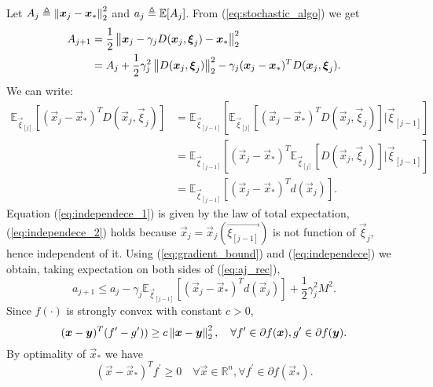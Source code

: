 Let $A_j\triangleq \left\Vert \boldsymbol{x}_j-\boldsymbol{x}_* \right\Vert^2_2$ and $a_j\triangleq\mathbb{E}[A_j]$.
From (\ref*{eq:stochastic_algo}) we get
\begin{equation}
\begin{aligned}
A_{j+1} &= \frac{1}{2}\left\Vert \boldsymbol{x}_j - \gamma_jD(\boldsymbol{x}_j,\boldsymbol{\xi}_j) -\boldsymbol{x}_* \right\Vert^2_2\\ 
&= A_j +\frac{1}{2}\gamma_j^2\left\Vert D(\boldsymbol{x}_j,\boldsymbol{\xi}_j) \right\Vert^2_2 - \gamma_j(\boldsymbol{x}_j-\boldsymbol{x}_*)^TD(\boldsymbol{x}_j,\boldsymbol{\xi}_j).
\end{aligned}
\label{eq:aj_rec}
\end{equation}
We can write:
\begin{align}
\mathbb{E}_{\vec{\xi}_{[j]}}[(\vec{x}_j-\vec{x}_*)^TD(\vec{x}_j,\vec{\xi}_j)] &= \mathbb{E}_{\vec{\xi}_{[j-1]}}[\mathbb{E}_{\vec{\xi}_{[j]}}[(\vec{x}_j-\vec{x}_*)^TD(\vec{x}_j,\vec{\xi}_j)]|\vec{\xi}_{[j-1]}] \label{eq:independece_1}\\ 
&= \mathbb{E}_{\vec{\xi}_{[j-1]}}[(\vec{x}_j-\vec{x}_*)^T\mathbb{E}_{\vec{\xi}_{[j]}}[D(\vec{x}_j,\vec{\xi}_j)]|\vec{\xi}_{[j-1]}]\label{eq:independece_2} \\ 	
&=\mathbb{E}_{\vec{\xi}_{[j-1]}}[(\vec{x}_j-\vec{x}_*)^Td(\vec{x}_j)].	\label{eq:independece}
\end{align}
Equation (\ref{eq:independece_1}) is given by the law of total expectation, (\ref{eq:independece_2}) holds because $\vec{x}_j = \vec{x}_j(\vec{\xi_{[j-1]}})$ is not function of $\vec{\xi}_j$, hence independent of it.
Using (\ref{eq:gradient_bound}) and (\ref{eq:independece}) we obtain, taking expectation on both sides of (\ref{eq:aj_rec}),
\begin{equation}
a_{j+1} \leq a_j - \gamma_j\mathbb{E}_{\vec{\xi}_{[j-1]}}[(\vec{x}_j-\vec{x}_*)^Td(\vec{x}_j)] + \frac{1}{2}\gamma_j^2M^2.
\label{eq:aj_rec_2}
\end{equation}
Since $f(\cdot)$ is strongly convex with constant $c>0$,
\begin{equation}
(\boldsymbol{x}-\boldsymbol{y})^T(f^\prime- g^\prime))\geq c \left\Vert \boldsymbol{x}-\boldsymbol{y} \right\Vert^2_2, \quad \forall f^\prime\in\partial f(\boldsymbol{x}), g^\prime\in\partial f(\boldsymbol{y}).
\label{eq:strong_convexity}
\end{equation}
By optimality of $\vec{x}_*$ we have
\begin{equation}
(\vec{x}-\vec{x}_*)^T f^\prime \geq 0 \quad \forall \vec{x} \in \mathbb{R}^n, \forall f^\prime\in\partial f(\vec{x}_*).
\label{eq:optimality}
\end{equation}
